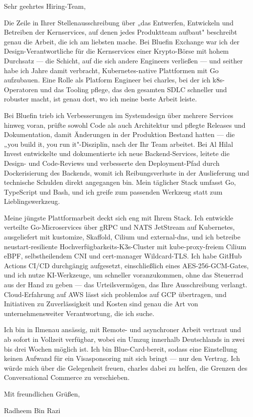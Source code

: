\documentclass[11pt,a4paper]{coverletter}
\begin{document}

\opening{Sehr geehrtes Hiring-Team,}

Die Zeile in Ihrer Stellenausschreibung über „das Entwerfen, Entwickeln und Betreiben der Kernservices, auf denen jedes Produktteam aufbaut" beschreibt genau die Arbeit, die ich am liebsten mache. Bei Bluefin Exchange war ich der Design-Verantwortliche für die Kernservices einer Krypto-Börse mit hohem Durchsatz — die Schicht, auf die sich andere Engineers verließen — und seither habe ich Jahre damit verbracht, Kubernetes-native Plattformen mit Go aufzubauen. Eine Rolle als Platform Engineer bei charles, bei der ich k8s-Operatoren und das Tooling pflege, das den gesamten SDLC schneller und robuster macht, ist genau dort, wo ich meine beste Arbeit leiste.

Bei Bluefin trieb ich Verbesserungen im Systemdesign über mehrere Services hinweg voran, prüfte sowohl Code als auch Architektur und pflegte Releases und Dokumentation, damit Änderungen in der Produktion Bestand hatten — die „you build it, you run it"-Disziplin, nach der Ihr Team arbeitet. Bei Al Hilal Invest entwickelte und dokumentierte ich neue Backend-Services, leitete die Design- und Code-Reviews und verbesserte den Deployment-Pfad durch Dockerisierung des Backends, womit ich Reibungsverluste in der Auslieferung und technische Schulden direkt angegangen bin. Mein täglicher Stack umfasst Go, TypeScript und Bash, und ich greife zum passenden Werkzeug statt zum Lieblingswerkzeug.

Meine jüngste Plattformarbeit deckt sich eng mit Ihrem Stack. Ich entwickle verteilte Go-Microservices über gRPC und NATS JetStream auf Kubernetes, ausgeliefert mit kustomize, Skaffold, Cilium und external-dns, und ich betreibe neustart-resiliente Hochverfügbarkeits-K3s-Cluster mit kube-proxy-freiem Cilium eBPF, selbstheilendem CNI und cert-manager Wildcard-TLS. Ich habe GitHub Actions CI/CD durchgängig aufgesetzt, einschließlich eines AES-256-GCM-Gates, und ich nutze KI-Werkzeuge, um schneller voranzukommen, ohne das Steuerrad aus der Hand zu geben — das Urteilsvermögen, das Ihre Ausschreibung verlangt. Cloud-Erfahrung auf AWS lässt sich problemlos auf GCP übertragen, und Initiativen zu Zuverlässigkeit und Kosten sind genau die Art von unternehmensweiter Verantwortung, die ich suche.

Ich bin in Ilmenau ansässig, mit Remote- und asynchroner Arbeit vertraut und ab sofort in Vollzeit verfügbar, wobei ein Umzug innerhalb Deutschlands in zwei bis drei Wochen möglich ist. Ich bin Blue-Card-bereit, sodass eine Einstellung keinen Aufwand für ein Visasponsoring mit sich bringt — nur den Vertrag. Ich würde mich über die Gelegenheit freuen, charles dabei zu helfen, die Grenzen des Conversational Commerce zu verschieben.

\closing{Mit freundlichen Grüßen,}{Radheem Bin Razi}
\end{document}
